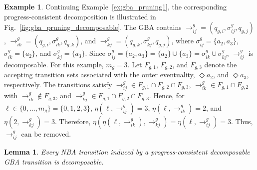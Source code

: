 \documentclass[lettersize,journal]{IEEEtran}
\theoremstyle{italiclemma}
\newtheorem{lemma}{Lemma}
\theoremstyle{italiclemma}
\theoremstyle{definition}
\newtheorem{example}{Example}
\begin{document}
\begin{example}\label{ex:gba_pruning2}
Continuing Example~\ref{ex:gba_pruning1}, the corresponding progress-consistent decomposition is illustrated in Fig.~\ref{fig:gba_pruning_decomposable}. The GBA contains $\rightarrow^g_{ij}=(q_{g,i},\sigma^g_{ij},q_{g,j})$, $\rightarrow^g_{ik}=(q_{g,i},\sigma^g_{ik},q_{g,k})$, and $\rightarrow^g_{kj}=(q_{g,k},\sigma^g_{kj},q_{g,j})$, where $\sigma^g_{ij}=\{a_2,a_3\}$, $\sigma^g_{ik}=\{a_2\}$, and $\sigma^g_{kj}=\{a_3\}$. Since $\sigma^g_{ij}=\{a_2,a_3\} =\{a_2\}\cup\{a_3\}
 =\sigma^g_{ik}\cup\sigma^g_{kj}$, $\rightarrow^g_{ij}$ is decomposable. For this example, $m_g=3$. Let $F_{g,1}$, $F_{g,2}$, and $F_{g,3}$ denote the accepting transition sets associated with the outer eventuality, $\Diamond a_2$, and $\Diamond a_3$, respectively. The transitions satisfy $\rightarrow^g_{ij}\in F_{g,1}\cap F_{g,2}\cap F_{g,3}$, $\rightarrow^g_{ik}\in F_{g,1}\cap F_{g,2}$ with $\rightarrow^g_{ik}\notin F_{g,3}$, and $\rightarrow^g_{kj}\in F_{g,1}\cap F_{g,2}\cap F_{g,3}$. Hence, for  $\ell\in\{0,\ldots,m_g\}=\{0,1,2,3\}$, $\eta(\ell,\rightarrow^g_{ij})=3$, $\eta(\ell,\rightarrow^g_{ik})=2$, and $\eta(2,\rightarrow^g_{kj})=3$. Therefore, $\eta(\eta(\ell,\rightarrow^g_{ik}),\rightarrow^g_{kj})=\eta(\ell,\rightarrow^g_{ij})=3$.
Thus, $\rightarrow^g_{ij}$ can be removed.
\end{example}

\begin{lemma}\label{l1}
Every NBA transition induced by a progress-consistent decomposable GBA transition is decomposable.
\end{lemma}
\end{document}
